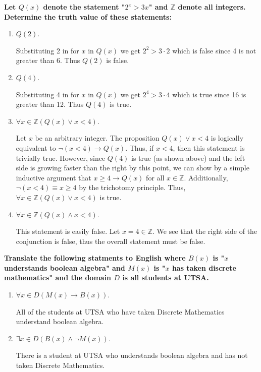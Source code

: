 \documentclass[letterpaper, 12pt]{article}
\begin{document}
\noindent\textbf{Let $Q(x)$ denote the statement "$2^x > 3x$" and $\mathbb{Z}$ denote all integers. Determine the truth value of these statements:}
\begin{enumerate}
    \item $Q(2)$.
    
        Substituting 2 in for $x$ in $Q(x)$ we get $2^2 > 3\cdot 2$ which is false since 4 is not greater than 6. Thus $Q(2)$ is false.
    
    \item $Q(4)$.
    
        Substituting 4 in for $x$ in $Q(x)$ we get $2^4 > 3\cdot 4$ which is true since 16 is greater than 12. Thus $Q(4)$ is true.
    
    \item $\forall x\in\mathbb{Z} (Q(x) \lor x<4)$.
    
        Let $x$ be an arbitrary integer. The proposition $Q(x) \lor x < 4$ is logically equivalent to $\lnot (x < 4) \rightarrow Q(x)$. Thus, if $x < 4$, then this statement is trivially true. However, since $Q(4)$ is true (as shown above) and the left side is growing faster than the right by this point, we can show by a simple inductive argument that $x \geq 4 \rightarrow Q(x)$ for all $x\in\mathbb{Z}$. Additionally, $\lnot (x < 4) \equiv x \geq 4$ by the trichotomy principle. Thus, $\forall x\in\mathbb{Z} (Q(x) \lor x<4)$ is true.
    
    \item $\forall x\in\mathbb{Z} (Q(x) \land x < 4)$.
    
        This statement is easily false. Let $x = 4 \in\mathbb{Z}$. We see that the right side of the conjunction is false, thus the overall statement must be false.
\end{enumerate}

\noindent\textbf{Translate the following statments to English where $B(x)$ is "$x$ understands boolean algebra" and $M(x)$ is "$x$ has taken discrete mathematics" and the domain $D$ is all students at UTSA.}
\begin{enumerate}
    \item $\forall x\in D (M(x) \rightarrow B(x))$.
    
        All of the students at UTSA who have taken Discrete Mathematics understand boolean algebra.
    
    \item $\exists x\in D (B(x) \land \lnot M(x))$.
    
        There is a student at UTSA who understands boolean algebra and has not taken Discrete Mathematics.
\end{enumerate}
\end{document}
